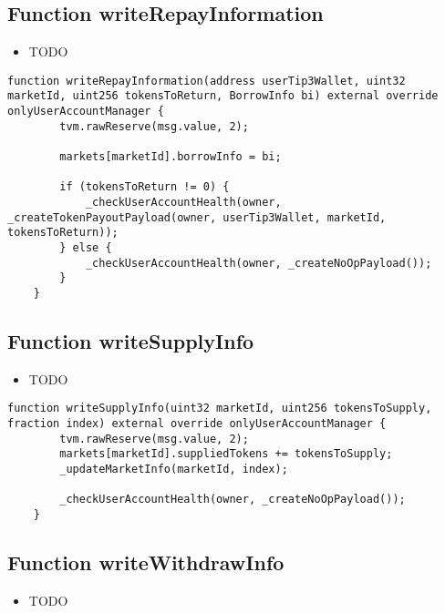 \subsection{Function writeRepayInformation}

\noindent\begin{itemize}
\item TODO
\end{itemize}

\begin{lstlisting}[firstnumber=234]
    function writeRepayInformation(address userTip3Wallet, uint32 marketId, uint256 tokensToReturn, BorrowInfo bi) external override onlyUserAccountManager {
        tvm.rawReserve(msg.value, 2);

        markets[marketId].borrowInfo = bi;
        
        if (tokensToReturn != 0) { 
            _checkUserAccountHealth(owner, _createTokenPayoutPayload(owner, userTip3Wallet, marketId, tokensToReturn));
        } else {
            _checkUserAccountHealth(owner, _createNoOpPayload());
        }
    }
\end{lstlisting}

\subsection{Function writeSupplyInfo}

\noindent\begin{itemize}
\item TODO
\end{itemize}

\begin{lstlisting}[firstnumber=112]
    function writeSupplyInfo(uint32 marketId, uint256 tokensToSupply, fraction index) external override onlyUserAccountManager {
        tvm.rawReserve(msg.value, 2);
        markets[marketId].suppliedTokens += tokensToSupply;
        _updateMarketInfo(marketId, index);

        _checkUserAccountHealth(owner, _createNoOpPayload());
    }
\end{lstlisting}

\subsection{Function writeWithdrawInfo}

\noindent\begin{itemize}
\item TODO
\end{itemize}

